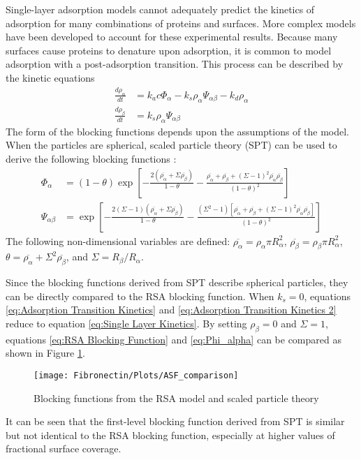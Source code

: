Single-layer adsorption models cannot adequately predict the kinetics
of adsorption for many combinations of proteins and surfaces. More
complex models have been developed to account for these experimental
results. Because many surfaces cause proteins to denature upon adsorption,
it is common to model adsorption with a post-adsorption transition.
This process can be described by the kinetic equations\begin{align}
\frac{d\rho_{\alpha}}{dt} & =k_{a}c\Phi_{\alpha}-k_{s}\rho_{\alpha}\Psi_{\alpha\beta}-k_{d}\rho_{\alpha}\label{eq:Adsorption Transition Kinetics}\\
\frac{d\rho_{\beta}}{dt} & =k_{s}\rho_{\alpha}\Psi_{\alpha\beta}\label{eq:Adsorption Transition Kinetics 2}\end{align}
The form of the blocking functions depends upon the assumptions of
the model. When the particles are spherical, scaled particle theory
(SPT) can be used to derive the following blocking functions \cite{Brusatori1999}:
\begin{align}
\Phi_{\alpha} & =\left(1-\theta\right)\exp\left[-\frac{2\left(\overline{\rho_{\alpha}}+\Sigma\overline{\rho_{\beta}}\right)}{1-\theta}-\frac{\overline{\rho_{\alpha}}+\overline{\rho_{\beta}}+\left(\Sigma-1\right)^{2}\overline{\rho_{\alpha}}\overline{\rho_{\beta}}}{\left(1-\theta\right)^{2}}\right]\label{eq:Phi_alpha}\\
\Psi_{\alpha\beta} & =\exp\left[-\frac{2\left(\Sigma-1\right)\left(\overline{\rho_{\alpha}}+\Sigma\overline{\rho_{\beta}}\right)}{1-\theta}-\frac{\left(\Sigma^{2}-1\right)\left[\overline{\rho_{\alpha}}+\overline{\rho_{\beta}}+\left(\Sigma-1\right)^{2}\overline{\rho_{\alpha}}\overline{\rho_{\beta}}\right]}{\left(1-\theta\right)^{2}}\right]\label{eq:Psi_alpha_beta}\end{align}
The following non-dimensional variables are defined: $\overline{\rho_{\alpha}}=\rho_{\alpha}\pi R_{\alpha}^{2}$,
$\overline{\rho_{\beta}}=\rho_{\beta}\pi R_{\alpha}^{2}$, $\theta=\overline{\rho_{\alpha}}+\Sigma^{2}\overline{\rho_{\beta}}$,
and $\Sigma=R_{\beta}/R_{\alpha}$.

Since the blocking functions derived from SPT describe spherical particles,
they can be directly compared to the RSA blocking function. When $k_{s}=0$,
equations \ref{eq:Adsorption Transition Kinetics} and \ref{eq:Adsorption Transition Kinetics 2}
reduce to equation \ref{eq:Single Layer Kinetics}. By setting $\rho_{\beta}=0$
and $\Sigma=1$, equations \ref{eq:RSA Blocking Function} and \ref{eq:Phi_alpha}
can be compared as shown in Figure \ref{fig:RSA and SPT Blocking Functions}.%
\begin{figure}
\texttt{[image: Fibronectin/Plots/ASF\_comparison]}

\caption{\label{fig:RSA and SPT Blocking Functions}Blocking functions from
the RSA model and scaled particle theory}

\end{figure}
 It can be seen that the first-level blocking function derived from
SPT is similar but not identical to the RSA blocking function, especially
at higher values of fractional surface coverage.

